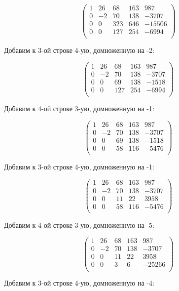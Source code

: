 	\[
	\begin{pmatrix}
	1 & 26 & 68 & 163 & 987 \\
	0 & -2 & 70 & 138 & -3707 \\
	0 & 0 & 323 & 646 & -15506 \\
	0 & 0 & 127 & 254 & -6994 \\
	\end{pmatrix}
	\]
	
	Добавим к 3-ой строке 4-ую, домноженную на -2:
	
	\[
	\begin{pmatrix}
	1 & 26 & 68 & 163 & 987 \\
	0 & -2 & 70 & 138 & -3707 \\
	0 & 0 & 69 & 138 & -1518 \\
	0 & 0 & 127 & 254 & -6994 \\
	\end{pmatrix}
	\]
	
	Добавим к 4-ой строке 3-ую, домноженную на -1:
	
	\[
	\begin{pmatrix}
	1 & 26 & 68 & 163 & 987 \\
	0 & -2 & 70 & 138 & -3707 \\
	0 & 0 & 69 & 138 & -1518 \\
	0 & 0 & 58 & 116 & -5476 \\
	\end{pmatrix}
	\]
	
	Добавим к 3-ой строке 4-ую, домноженную на -1:
	
	\[
	\begin{pmatrix}
	1 & 26 & 68 & 163 & 987 \\
	0 & -2 & 70 & 138 & -3707 \\
	0 & 0 & 11 & 22 & 3958 \\
	0 & 0 & 58 & 116 & -5476 \\
	\end{pmatrix}
	\]
	
	Добавим к 4-ой строке 3-ую, домноженную на -5:
	
	\[
	\begin{pmatrix}
	1 & 26 & 68 & 163 & 987 \\
	0 & -2 & 70 & 138 & -3707 \\
	0 & 0 & 11 & 22 & 3958 \\
	0 & 0 & 3 & 6 & -25266 \\
	\end{pmatrix}
	\]
	
	Добавим к 3-ой строке 4-ую, домноженную на -4:
	

